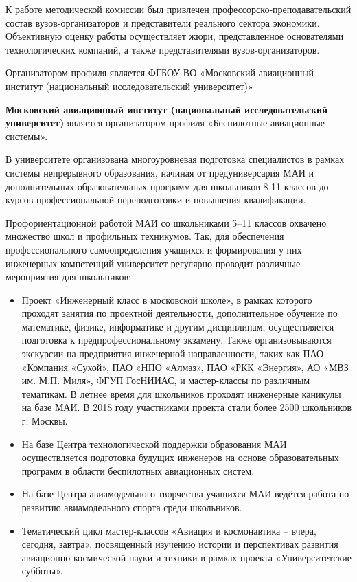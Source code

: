 К работе методической комиссии был привлечен профессорско-преподавательский состав вузов-организаторов и представители реального сектора экономики. Объективную оценку работы осуществляет жюри, представленное основателями технологических компаний, а также представителями вузов-организаторов.  

Организатором профиля является ФГБОУ ВО «Московский авиационный институт (национальный исследовательский университет)»

\textbf{Московский авиационный институт (национальный исследовательский университет)} является организатором профиля «Беспилотные авиационные системы».

В университете организована многоуровневая подготовка специалистов в рамках системы непрерывного образования, начиная от предуниверсария МАИ и дополнительных образовательных программ для школьников 8-11 классов до курсов профессиональной переподготовки и повышения квалификации.

Профориентационной работой МАИ со школьниками 5–11 классов охвачено множество школ и профильных техникумов. Так, для обеспечения профессионального самоопределения учащихся и формирования у них инженерных компетенций университет регулярно проводит различные мероприятия для школьников:
\begin{itemize}
    \item Проект «Инженерный класс в московской школе», в рамках которого проходят занятия по проектной деятельности, дополнительное обучение по математике, физике, информатике и другим дисциплинам, осуществляется подготовка к предпрофессиональному экзамену. Также организовываются экскурсии на предприятия инженерной направленности, таких как ПАО «Компания «Сухой», ПАО «НПО «Алмаз», ПАО «РКК «Энергия», АО «МВЗ им. М.П. Миля», ФГУП ГосНИИАС, и мастер-классы по различным тематикам. В летнее время для школьников проходят инженерные каникулы на базе МАИ. В 2018 году участниками проекта стали более 2500 школьников г. Москвы.
    \item На базе Центра технологической поддержки образования МАИ осуществляется подготовка будущих инженеров на основе образовательных программ в области беспилотных авиационных систем.
    \item На базе Центра авиамодельного творчества учащихся МАИ ведётся работа по развитию авиамодельного спорта среди школьников.
    \item Тематический цикл мастер-классов «Авиация и космонавтика – вчера, сегодня, завтра», посвященный изучению истории и перспективах развития авиационно-космической науки и техники в рамках проекта «Университетские субботы».
\end{itemize}


